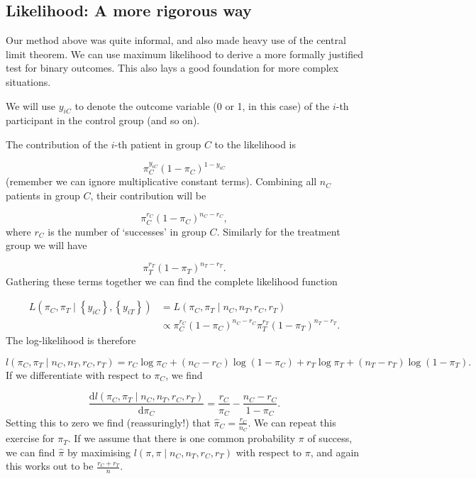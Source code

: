 \documentclass[
  openany]{book}
\theoremstyle{definition}
\theoremstyle{definition}
\theoremstyle{definition}
\theoremstyle{definition}
\theoremstyle{remark}
\begin{document}
\subsection{Likelihood: A more rigorous way}\label{likelihood-a-more-rigorous-way}

Our method above was quite informal, and also made heavy use of the central limit theorem. We can use maximum likelihood to derive a more formally justified test for binary outcomes. This also lays a good foundation for more complex situations.

We will use \(y_{iC}\) to denote the outcome variable (0 or 1, in this case) of the \(i\)-th participant in the control group (and so on).

The contribution of the \(i\)-th patient in group \(C\) to the likelihood is

\[\pi_C^{y_{iC}}\left(1 - \pi_C\right)^{1-y_{iC}} \]
(remember we can ignore multiplicative constant terms). Combining all \(n_C\) patients in group \(C\), their contribution will be

\[ \pi_C^{r_C}\left(1-\pi_C\right)^{n_C - r_C},\]
where \(r_C\) is the number of `successes' in group \(C\). Similarly for the treatment group we will have

\[ \pi_T^{r_T}\left(1-\pi_T\right)^{n_T - r_T}.\]
Gathering these terms together we can find the complete likelihood function

\[
\begin{aligned}
L\left(\pi_C,\pi_T \mid \left\lbrace y_{iC}\right\rbrace, \left\lbrace y_{iT}\right\rbrace \right) & =
  L\left( \pi_C,\pi_T \mid {n_C,n_T, r_C, r_T}\right)\\
  & \propto \pi_C^{r_C}\left(1-\pi_C\right)^{n_C - r_C}\pi_T^{r_T}\left(1-\pi_T\right)^{n_T - r_T}.
\end{aligned}
\]
The log-likelihood is therefore

\[ l\left( \pi_C,\pi_T \mid {n_C,n_T, r_C, r_T}\right) = r_C\log\pi_C + \left(n_C-r_C\right)\log\left(1-\pi_C\right) + r_T\log\pi_T + \left(n_T-r_T\right)\log\left(1-\pi_T\right).\]
If we differentiate with respect to \(\pi_C\), we find

\[\frac{\mathrm{d} l\left( \pi_C,\pi_T \mid {n_C,n_T, r_C, r_T}\right)}{\mathrm{d}\pi_C} = \frac{r_C}{\pi_C} - \frac{n_C-r_C}{1-\pi_C}.\]
Setting this to zero we find (reassuringly!) that \(\hat\pi_C = \frac{r_C}{n_C}\). We can repeat this exercise for \(\pi_T\). If we assume that there is one common probability \(\pi\) of success, we can find \(\hat\pi\) by maximising
\(l\left(\pi,\pi \mid {n_C,n_T, r_C, r_T}\right)\) with respect to \(\pi\), and again this works out to be \(\frac{r_{C} + r_T}{n}\).
\end{document}
